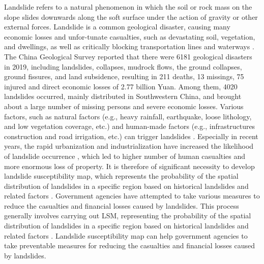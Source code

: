 \documentclass[a4paper,fleqn]{cas-sc}
\begin{document}
Landslide refers to a natural phenomenon in which the soil or rock mass on the slope slides downwards along the soft surface under the action of gravity or other external forces.
Landslide is a common geological disaster, causing many economic losses and unfor-tunate casualties, such as devastating soil, vegetation, and dwellings, as well as critically blocking transportation lines and waterways \citep{Abuzied2016JoMS, 2017Chenp147160}.
The China Geological Survey reported that there were 6181 geological disasters in 2019, including landslides, collapses, mudrock flows, the ground collapses, ground fissures, and land subsidence, resulting in 211 deaths, 13 missings, 75 injured and direct economic losses of 2.77 billion Yuan.
Among them, 4020 landslides occurred, mainly distributed in Southwestern China, and brought about a large number of missing persons and severe economic losses.
Various factors, such as natural factors (e.g., heavy rainfall, earthquake, loose lithology, and low vegetation coverage, etc.) and human-made factors (e.g., infrastructures construction and road irrigation, etc.) can trigger landslides \citep{2018Wildep97104}.
Especially in recent years, the rapid urbanization and industrialization have increased the likelihood of landslide occurrence \citep{2020Kocamanp118}, which led to higher number of human casualties and more enormous loss of property. 
It is therefore of significant necessity to develop landslide susceptibility map, which represents the probability of the spatial distribution of landslides in a specific region based on historical landslides and related factors \citep{Yu2016IJERPH,Song2018}.
Government agencies have attempted to take various measures to reduce the casualties and financial losses caused by landslides. 
This process generally involves carrying out LSM, representing the probability of the spatial distribution of landslides in a specific region based on historical landslides and related factors \citep{Yu2016IJERPH,Song2018}. 
Landslide susceptibility map can help government agencies to take preventable measures for reducing the casualties and financial losses caused by landslides.
\end{document}
